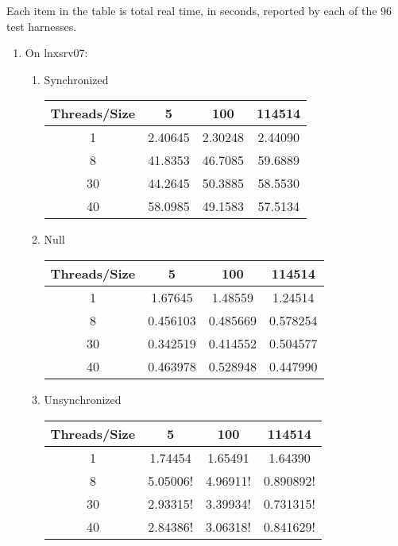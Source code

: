\documentclass[letterpaper,twocolumn,10pt]{article}
\begin{document}
Each item in the table is total real time, in seconds, reported by each of the 96 test harnesses.
\begin{enumerate}
  \item   
  On lnxsrv07:
  \begin{enumerate}
    \item 
    Synchronized
    \begin{center}
      \begin{tabular}{|c|c|c|c|}
      \hline
        Threads/Size & 5 & 100 & 114514 \\
      \hline 1 & 2.40645 & 2.30248 & 2.44090 \\
      \hline 8 & 41.8353 & 46.7085 & 59.6889 \\
      \hline 30 & 44.2645 & 50.3885 & 58.5530 \\
      \hline 40 & 58.0985 & 49.1583 & 57.5134 \\
      \hline
      \end{tabular}
    \end{center}
    \item 
    Null
    \begin{center}
      \begin{tabular}{|c|c|c|c|}
      \hline
        Threads/Size & 5 & 100 & 114514 \\
      \hline 1 & 1.67645 & 1.48559 & 1.24514 \\
      \hline 8 & 0.456103 & 0.485669 & 0.578254 \\
      \hline 30 & 0.342519 & 0.414552 & 0.504577 \\
      \hline 40 & 0.463978 & 0.528948 & 0.447990 \\
      \hline
      \end{tabular}
    \end{center}
    \item 
    Unsynchronized
    \begin{center}
      \begin{tabular}{|c|c|c|c|}
      \hline
        Threads/Size & 5 & 100 & 114514 \\
      \hline 1 & 1.74454 & 1.65491 & 1.64390 \\
      \hline 8 & 5.05006! & 4.96911! & 0.890892! \\
      \hline 30 & 2.93315! & 3.39934! & 0.731315! \\
      \hline 40 & 2.84386! & 3.06318! & 0.841629! \\
      \hline
      \end{tabular}
    \end{center}

\end{enumerate}
\end{enumerate}
\end{document}
